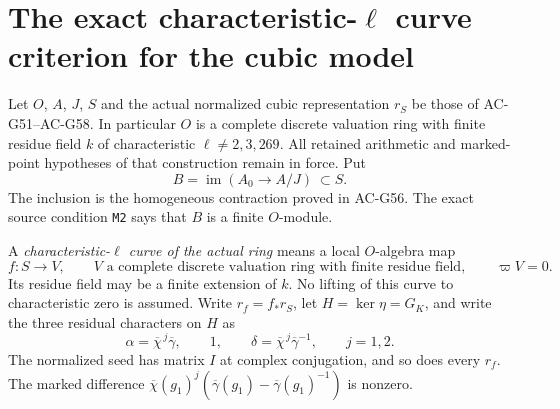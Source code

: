 \section{The exact characteristic-\(\ell\) curve criterion for the cubic model}
\label{sec:cubic-characteristic-curve-criterion}

Let \(O\), \(A\), \(J\), \(S\) and the actual normalized cubic
representation \(r_S\) be those of AC-G51--AC-G58.
In particular \(O\) is a complete discrete valuation ring with
finite residue field \(k\) of characteristic
\(\ell\ne2,3,269\).  All retained arithmetic and marked-point
hypotheses of that construction remain in force.
Put
\[
 B=\operatorname{im}(A_0\longrightarrow A/J)
       \ \subset S .
                                                               \tag{G59.1}
\]
The inclusion is the homogeneous contraction proved in AC-G56.
The exact source condition \texttt{M2} says that \(B\) is a
finite \(O\)-module.

A \emph{characteristic-\(\ell\) curve of the actual ring} means
a local \(O\)-algebra map
\[
 f:S\longrightarrow V,\qquad
 V\text{ a complete discrete valuation ring with finite
 residue field},\qquad \varpi V=0 .
                                                               \tag{G59.2}
\]
Its residue field may be a finite extension of \(k\).
No lifting of this curve to characteristic zero is assumed.
Write \(r_f=f_*r_S\), let \(H=\ker\eta=G_K\), and write the
three residual characters on \(H\) as
\[
 \alpha=\overline\chi^{\,j}\overline\gamma,\qquad
 1,\qquad
 \delta=\overline\chi^{\,j}\overline\gamma^{-1},
                    \qquad j=1,2 .
                                                               \tag{G59.3}
\]
The normalized seed has matrix \(I\) at complex conjugation,
and so does every \(r_f\).  The marked difference
\(\overline\chi(g_1)^j
(\overline\gamma(g_1)-\overline\gamma(g_1)^{-1})\)
is nonzero.

